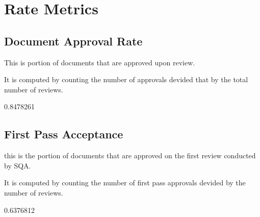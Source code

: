 \documentclass{article}
\begin{document}
\section{Rate Metrics}
\subsection{Document Approval Rate}
This is portion of documents that are approved upon review.

It is computed by counting the number of approvals devided that by the total number of reviews.

\begin{Schunk}
\begin{Soutput}
[1] 0.8478261
\end{Soutput}
\end{Schunk}

\subsection{First Pass Acceptance}
this is the portion of documents that are approved on the first review conducted
by SQA.

It is computed by counting the number of first pass approvals devided by
the number of reviews.

\begin{Schunk}
\begin{Soutput}
[1] 0.6376812
\end{Soutput}
\end{Schunk}
\end{document}

